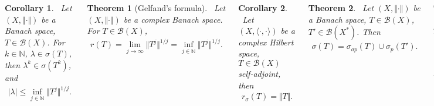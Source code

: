 \documentclass{tikzposter} %
\newtheorem{theorem}{Theorem}
\newtheorem{corollary}{Corollary}
\begin{document}
\begin{columns}
{    \begin{corollary}
    \ Let $(X, \Vert \cdot \Vert)$ be a Banach space, $T \in \mathcal{B}(X)$. For $k \in \mathbb{N}$, $\lambda \in \sigma(T)$, then $\lambda^{k} \in \sigma(T^{k})$, and
    \begin{align*}
      |\lambda| \le \inf_{j \in \mathbb{N}} \Vert T^{j} \Vert^{1/j}.
    \end{align*}
    \end{corollary}
    \hphantom{}

    \begin{theorem}[Gelfand's formula]
    \ Let $(X, \Vert \cdot \Vert)$ be a complex Banach space. For $T \in \mathcal{B}(X)$,
    \begin{align*}
      r(T) = \lim_{j \to \infty} \Vert T^{j} \Vert^{1/j} = \inf_{j \in \mathbb{N}} \Vert T^{j} \Vert^{1/j}.
    \end{align*}
    \end{theorem}
    \hphantom{}

    \begin{corollary}
    \ Let $(X, \langle \cdot, \cdot \rangle)$ be a complex Hilbert space, $T \in \mathcal{B}(X)$ self-adjoint, then
    \begin{align*}
      r_{\sigma}(T) = \Vert T \Vert.
    \end{align*}
    \end{corollary}

    \begin{theorem}
    \ Let $(X, \Vert \cdot \Vert)$ be a Banach space, $T \in \mathcal{B}(X)$, $T' \in \mathcal{B}(X^{*})$. Then
    \begin{align*}
      \sigma(T) = \sigma_{ap}(T) \cup \sigma_{p}(T').
    \end{align*}
    \end{theorem}
    \hphantom{}

    \begin{theorem}
    \ Let $(X, \langle \cdot , \cdot \rangle)$ be a complex Hilbert space, $T \in \mathcal{B}(X)$. Then
    \begin{align*}
      \sigma(T) = \sigma_{ap}(T) \cup \sigma'_{p}(T^{*})
    \end{align*}
    where for $A \subseteq \mathbb{C}$, $A' = \{\overline{x} : x \in A\}$.
    \end{theorem}
    \hphantom{}

}
\end{columns}
\end{document}
